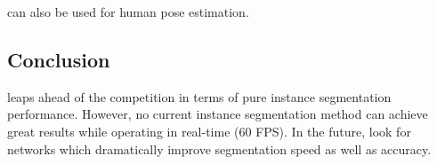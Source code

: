 \maskrcnn can also be used for human pose estimation.

\subsection{Conclusion}
\maskrcnn leaps ahead of the competition in terms of pure instance segmentation performance. However, no current instance segmentation method can achieve great results while operating in real-time (60 FPS). In the future, look for networks which dramatically improve segmentation speed as well as accuracy.



